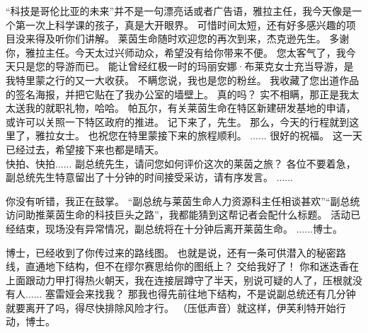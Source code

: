 \documentclass[openany]{book}
\begin{document}
\begin{dialogue}
     “科技是哥伦比亚的未来”并不是一句漂亮话或者广告语，雅拉主任，我今天像是一个第一次上科学课的孩子，真是大开眼界。
     可惜时间太短，还有好多感兴趣的项目没来得及听你们讲解。
     莱茵生命随时欢迎您的再次到来，杰克逊先生。
     多谢你，雅拉主任。今天太过兴师动众，希望没有给你带来不便。
     您太客气了，我今天只是您的导游而已。
     能让曾经红极一时的玛丽安娜·布莱克女士充当导游，是我特里蒙之行的又一大收获。
     不瞒您说，我也是您的粉丝。
     我收藏了您出道作品的签名海报，并把它贴在了我办公室的墙壁上。
     真的吗？
     实不相瞒，那正是我太太送我的就职礼物，哈哈。
     帕瓦尔，有关莱茵生命在特区新建研发基地的申请，或许可以关照一下特区政府的推进。
     记下来了，先生。
     那么，今天的行程就到这里了，雅拉女士。
     也祝您在特里蒙接下来的旅程顺利。
     ......
     很好的祝福。
     这一天已经过去，希望接下来也都是晴天。
    \\
     快拍、快拍......
     副总统先生，请问您如何评价这次的莱茵之旅？
     各位不要着急，副总统先生特意留出了十分钟的时间接受采访，请有序发言。
     ......
\end{dialogue}

\begin{dialogue}
     你没有听错，我正在鼓掌。
     “副总统与莱茵生命人力资源科主任相谈甚欢”“副总统访问助推莱茵生命的科技巨头之路”，我都能猜到这帮记者会配什么标题。
     活动已经结束，现场没有异常情况，副总统将在十分钟后离开莱茵生命。
     ......博士。
\end{dialogue}

\begin{dialogue}
     博士，已经收到了你传过来的路线图。
     也就是说，还有一条可供潜入的秘密路线，直通地下结构，但不在缪尔赛思给你的图纸上？
     交给我好了！
     你和迷迭香在上面跟动力甲打得热火朝天，我在连接层蹲守了半天，别说可疑的人了，压根就没有人......
     塞雷娅会来找我？
     那我也得先前往地下结构，不是说副总统还有几分钟就要离开了吗，得尽快排除风险才行。
     （压低声音）就这样，伊芙利特开始行动，博士。
\end{dialogue}
\end{document}
